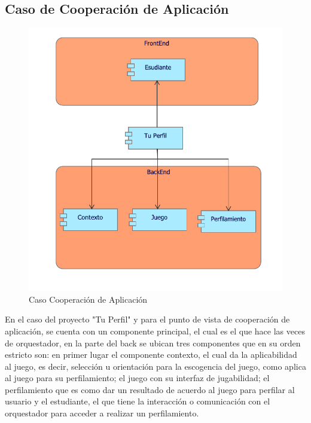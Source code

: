 \subsection{Caso  de Cooperación de Aplicación}
\begin{figure}[h!]
	\centering
	\includegraphics[width=.8\linewidth]{imgs/caso/aplicacion/CoopAplicacion}
	\caption{Caso Cooperación de Aplicación}
\end{figure}

En el caso del proyecto "Tu Perfil" y para el punto de vista de cooperación de aplicación, se cuenta con un componente principal, el cual es el que hace las veces de orquestador, en la parte del back se ubican tres componentes que en su orden estricto son: en primer lugar el componente contexto, el cual da la aplicabilidad al juego, es decir, selección u orientación para la escogencia del juego, como aplica al juego para su perfilamiento; el juego con su interfaz de jugabilidad; el perfilamiento que es como dar un resultado de acuerdo al juego para perfilar al usuario y el estudiante, el que tiene la interacción o comunicación con el orquestador para acceder a realizar un perfilamiento.

\newpage